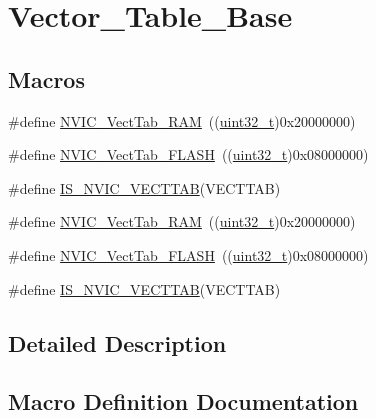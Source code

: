 \hypertarget{group___vector___table___base}{}\section{Vector\+\_\+\+Table\+\_\+\+Base}
\label{group___vector___table___base}
\subsection*{Macros}
\begin{DoxyCompactItemize}
\item 
\#define \hyperlink{group___vector___table___base_ga8be8181cc3e5d42f6204af306ab50f80}{N\+V\+I\+C\+\_\+\+Vect\+Tab\+\_\+\+R\+AM}~((\hyperlink{_p_e___types_8h_a33594304e786b158f3fb30289278f5af}{uint32\+\_\+t})0x20000000)
\item 
\#define \hyperlink{group___vector___table___base_gafbf92fd28a1090b2aa49732ebd5704b5}{N\+V\+I\+C\+\_\+\+Vect\+Tab\+\_\+\+F\+L\+A\+SH}~((\hyperlink{_p_e___types_8h_a33594304e786b158f3fb30289278f5af}{uint32\+\_\+t})0x08000000)
\item 
\#define \hyperlink{group___vector___table___base_ga26b9d493ccb98fcce9a27303078940c8}{I\+S\+\_\+\+N\+V\+I\+C\+\_\+\+V\+E\+C\+T\+T\+AB}(V\+E\+C\+T\+T\+AB)
\item 
\#define \hyperlink{group___vector___table___base_ga8be8181cc3e5d42f6204af306ab50f80}{N\+V\+I\+C\+\_\+\+Vect\+Tab\+\_\+\+R\+AM}~((\hyperlink{_p_e___types_8h_a33594304e786b158f3fb30289278f5af}{uint32\+\_\+t})0x20000000)
\item 
\#define \hyperlink{group___vector___table___base_gafbf92fd28a1090b2aa49732ebd5704b5}{N\+V\+I\+C\+\_\+\+Vect\+Tab\+\_\+\+F\+L\+A\+SH}~((\hyperlink{_p_e___types_8h_a33594304e786b158f3fb30289278f5af}{uint32\+\_\+t})0x08000000)
\item 
\#define \hyperlink{group___vector___table___base_ga26b9d493ccb98fcce9a27303078940c8}{I\+S\+\_\+\+N\+V\+I\+C\+\_\+\+V\+E\+C\+T\+T\+AB}(V\+E\+C\+T\+T\+AB)
\end{DoxyCompactItemize}


\subsection{Detailed Description}


\subsection{Macro Definition Documentation}

